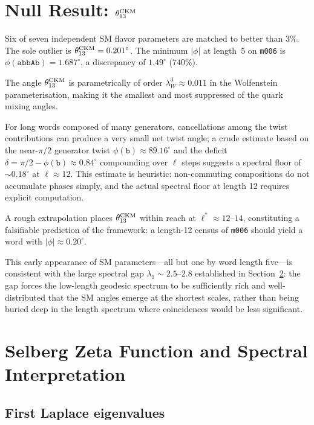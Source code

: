 \documentclass[preprint,12pt,number]{elsarticle}
\newcommand{\mfld}[1]{\texttt{#1}}
\newcommand{\word}[1]{\texttt{#1}}
\newcommand{\degr}{^{\circ}}
\begin{document}
\section{Null Result: \texorpdfstring{$\theta_{13}^{\rm CKM}$}{theta13(CKM)}}
\label{sec:null}

Six of seven independent SM flavor parameters are matched to better than $3\%$.
The sole outlier is $\theta_{13}^{\rm CKM}=0.201\degr$.
The minimum $|\phi|$ at length~5 on \mfld{m006} is
$\phi(\word{abbAb})=1.687\degr$, a discrepancy of $1.49\degr$ ($740\%$).

The angle $\theta_{13}^{\rm CKM}$ is parametrically of order
$\lambda_W^3\approx 0.011$ in the Wolfenstein parameterisation,
making it the smallest and most suppressed of the quark mixing angles.

For long words composed of many generators, cancellations among the
twist contributions can produce a very small net twist angle; a
crude estimate based on the near-$\pi/2$ generator twist
$\phi(\word{b})\approx 89.16\degr$ and the deficit
$\delta=\pi/2-\phi(\word{b})\approx 0.84\degr$ compounding over
$\ell$ steps suggests a spectral floor of ${\sim}0.18\degr$ at
$\ell\approx 12$.
This estimate is heuristic: non-commuting compositions do not accumulate
phases simply, and the actual spectral floor at length 12 requires
explicit computation.

A rough extrapolation places $\theta_{13}^{\rm CKM}$ within reach at
$\ell^*\approx 12$--$14$, constituting a falsifiable prediction of the
framework: a length-12 census of \mfld{m006} should yield a word with
$|\phi|\approx 0.20\degr$.

This early appearance of SM parameters---all but one by word length
five---is consistent with the large spectral gap $\lambda_1\sim 2.5$--$2.8$
established in Section~\ref{sec:selberg}: the gap forces the low-length
geodesic spectrum to be sufficiently rich and well-distributed that the SM
angles emerge at the shortest scales, rather than being buried deep in the
length spectrum where coincidences would be less significant.

\section{Selberg Zeta Function and Spectral Interpretation}
\label{sec:selberg}

\subsection{First Laplace eigenvalues}
\end{document}
